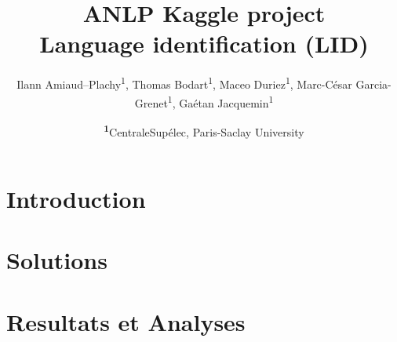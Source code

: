 \documentclass[
	a4paper, %
	10pt, %
	unnumberedsections, %
	twoside, %
]{LTJournalArticle}
\title{ANLP Kaggle project\\ \LARGE Language identification (LID)} %
\author{%
    Ilann Amiaud--Plachy\textsuperscript{1},
    Thomas Bodart\textsuperscript{1},
    Maceo Duriez\textsuperscript{1},
    Marc-César Garcia-Grenet\textsuperscript{1},
    Gaétan Jacquemin\textsuperscript{1}
}
\date{\footnotesize\textsuperscript{\textbf{1}}CentraleSupélec, Paris-Saclay University}
\begin{document}
\maketitle %


\section{Introduction}

    

\section{Solutions}

    

\section{Resultats et Analyses}

    


    \printbibliography
\end{document}
